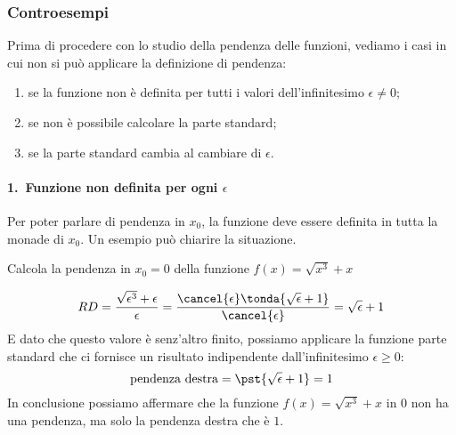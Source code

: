 \subsubsection{Controesempi}
\label{subsubsec:controesempi}

Prima di procedere con lo studio della pendenza delle funzioni, vediamo 
i casi in cui non si può applicare la definizione di pendenza:
\begin{enumerate} [nosep]
\item se la funzione non è definita per tutti i valori dell'infinitesimo 
\(\epsilon \ne 0\);
\item se non è possibile calcolare la parte standard;
\item se la parte standard cambia al cambiare di \(\epsilon\).
\end{enumerate}

\paragraph{1.~Funzione non definita per ogni \(\epsilon\)}

Per poter parlare di pendenza in  \(x_0\), la funzione deve essere 
definita in tutta la monade di \(x_0\).
Un esempio può chiarire la situazione.

\begin{esempio}
Calcola la pendenza in \(x_0 = 0\) della funzione \(f(x) = \sqrt{x^3}+x\)

\[RD = \dfrac{\sqrt{\epsilon^3} + \epsilon}{\epsilon} =
       \dfrac{\cancel{\epsilon} \tonda{\sqrt{\epsilon} + 1}}
             {\cancel{\epsilon}} = \sqrt{\epsilon} + 1
\]
E dato che questo valore è senz'altro finito, possiamo applicare la 
funzione parte standard che ci fornisce un risultato indipendente 
dall'infinitesimo \(\epsilon \geqslant 0\):
\[\text{pendenza destra} = \pst{\sqrt{\epsilon} + 1} = 1\]
In conclusione possiamo affermare che la funzione \(f(x) = \sqrt{x^3}+x\) 
in \(0\) non ha una pendenza, ma solo la pendenza destra che è \(1\).
\end{esempio}

